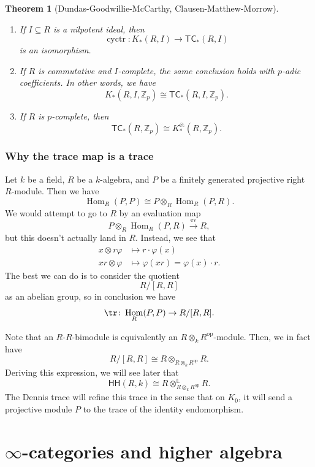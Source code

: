 \documentclass[10pt, oneside]{memoir}
\theoremstyle{definition}
\theoremstyle{remark}
\theoremstyle{plain}
\newtheorem*{thm*}{Theorem}
\theoremstyle{definition}
\theoremstyle{remark}
\newcommand{\Z}{\mathbb{Z}}
\renewcommand{\L}{\mathbb{L}}
\newcommand{\on}[1]{\operatorname{#1}}
\newcommand{\ms}[1]{\mathsf{#1}}
\newcommand{\1}{\mathbf{1}}
\newcommand{\2}{\mathbf{2}}
\newcommand{\3}{\mathbf{3}}
\newcommand{\TC}{\ms{TC}}
\newcommand{\HH}{\ms{HH}}
\DeclareMathOperator{\Hom}{Hom}
\DeclareMathOperator{\ev}{ev}
\DeclareMathOperator{\op}{op}
\begin{document}
\begin{thm*}[Dundas-Goodwillie-McCarthy, Clausen-Matthew-Morrow]\leavevmode
    \begin{enumerate}
        \item If \(I \subseteq R \) is a nilpotent ideal, then 
        \[ \on{cyctr} \colon K_*(R,I) \to \TC_*(R, I) \]
        is an isomorphism.
        \item If \(R \) is commutative and \(I \)-complete, the same conclusion holds with \(p \)-adic coefficients. In other words, we have
        \[
            K_*(R, I, \Z_p) \cong \TC_*(R, I, \Z_p).
        \]
        \item If \(R \) is \(p \)-complete, then 
        \[ \TC_*(R, \Z_p) \cong K_*^{\text{\'et}}(R, \Z_p). \]
    \end{enumerate}
\end{thm*}

\subsection*{Why the trace map is a trace}%
\label{sub:Why the trace map is a trace}

Let \(k \) be a field, \(R \) be a \(k \)-algebra, and \(P \) be a finitely generated projective right \(R \)-module. Then we have
\[ \Hom_R(P, P) \cong P \otimes_R \Hom_R(P, R). \]
We would attempt to go to \(R \) by an evaluation map
\[ P \otimes_R \Hom_R(P, R) \xrightarrow{\ev} R, \]
but this doesn't actually land in \(R \). Instead, we see that
\begin{align*}
    x \otimes r \varphi &\mapsto r \cdot \varphi(x) \\
    xr \otimes \varphi &\mapsto \varphi(xr) = \varphi(x) \cdot r.
\end{align*}
The best we can do is to consider the quotient
\[ R / [R,R] \]
as an abelian group, so in conclusion we have
\[ \tr \colon \Hom_R(P, P) \to R/[R,R]. \]

Note that an \(R \)-\(R \)-bimodule is equivalently an \(R \otimes_k R^{\op} \)-module. Then, we in fact have
\[ R/[R,R] \cong R \otimes_{R \otimes_k R^{\op}} R. \]
Deriving this expression, we will see later that
\[ \HH(R, k) \cong R \otimes^{\L}_{R \otimes_k R^{\op}} R. \]
The Dennis trace will refine this trace in the sense that on \(K_0 \), it will send a projective module \(P \) to the trace of the identity endomorphism.

\chapter{\texorpdfstring{\(\infty \)-categories and higher algebra}{Infinity-categories and higher algebra}}\thispagestyle{firstpage}
\end{document}
